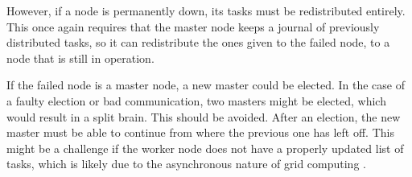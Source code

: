 However, if a node is permanently down, its tasks must be redistributed entirely. This once again requires that the master node keeps a journal of previously distributed tasks, so it can redistribute the ones given to the failed node, to a node that is still in operation. 

If the failed node is a master node, a new master could be elected. In the case of a faulty election or bad communication, two masters might be elected, which would result in a split brain. This should be avoided. After an election, the new master must be able to continue from where the previous one has left off. This might be a challenge if the worker node does not have a properly updated list of tasks, which is likely due to the asynchronous nature of grid computing \cite{upadhyay_2021}.
